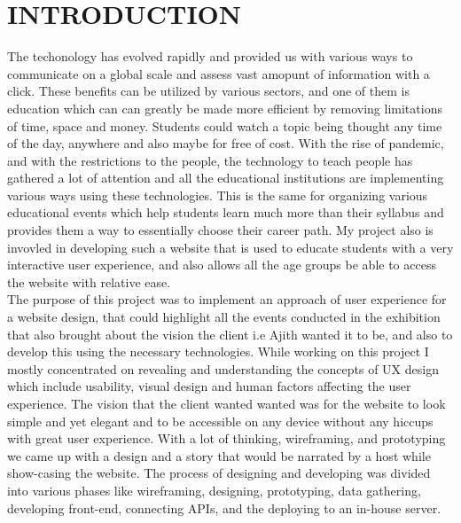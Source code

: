 \chapter{INTRODUCTION} %
\label{ChapterIntroduction} %



The techonology has evolved rapidly and provided us with various ways to communicate on a global scale and assess vast amopunt of information with a click. These benefits can be utilized by various sectors, and one of them is education which can can greatly be made more efficient by removing limitations of time, space and money. Students could watch a topic being thought any time of the day, anywhere and also maybe for free of cost. With the rise of pandemic, and with the restrictions to the people, the technology to teach people has gathered a lot of attention and all the educational institutions are implementing various ways using these technologies. This is the same for organizing various educational events which help students learn much more than their syllabus and provides them a way to essentially choose their career path. My project also is invovled in developing such a website that is used to educate students with a very interactive user experience, and also allows all the age groups be able to access the website with relative ease.
\\
The purpose of this project was to implement an approach of user experience for a website design, that could highlight all the events conducted in the exhibition that also brought about the vision the client i.e Ajith wanted it to be, and also to develop this using the necessary technologies. While working on this project I mostly 
concentrated on revealing and understanding the concepts of UX design which include usability, visual design and human factors affecting the user experience.
The vision that the client wanted wanted was for the website to look simple and yet elegant and to be accessible on any device without any hiccups with great user experience. With a lot of thinking, wireframing, and prototyping we came up with a design and a story that would be narrated by a host while show-casing the website.
The process of designing and developing was divided into various phases like wireframing, designing, prototyping, data gathering, developing front-end, connecting APIs, and the deploying to an in-house server.   


